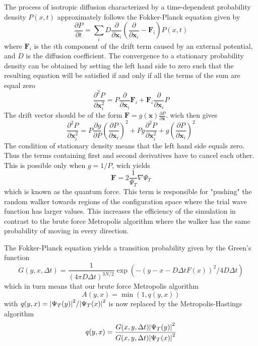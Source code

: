 \documentclass[a4paper, 10pt, english]{revtex4-2} %
\newcommand{\parder}[2]{\frac{\partial #1}{\partial #2}}
\newcommand{\dder}[2]{\frac{\partial^2 #1}{\partial #2^2}}
\begin{document}
        The process of isotropic diffusion characterized by a time-dependent probability density $P(x, t)$ approximately follows the Fokker-Planck equation given by
        \begin{equation}
            \parder{P}{t}
            =   \sum_i D\parder{}{\mathbf{x}_i}\left(\parder{}{\mathbf{x}_i} - \mathbf{F}_i\right)P(x, t)
        \end{equation}
        where $\mathbf{F}_i$ is the $i$th component of the drift term caused by an external potential, and $D$ is the diffusion coefficient. 
        The convergence to a stationary probability density can be obtained by setting the left hand side to zero such that the resulting equation will be satisfied if and only if all the terms of the sum are equal zero
        \begin{equation}
                \dder{P}{\mathbf{x}_i}
            =   P\parder{}{\mathbf{x}_i}\mathbf{F}_i + \mathbf{F}_i\parder{}{\mathbf{x}_i}P
        \end{equation}
        The drift vector should be of the form $\mathbf{F} = g(\mathbf{x})\parder{P}{\mathbf{x}}$. wich then gives
        \begin{equation}
            \dder{P}{\mathbf{x}_i}
            =   P\parder{g}{P}\left(\parder{P}{\mathbf{x}_i}\right)^2 + Pg\dder{P}{\mathbf{x}_i} + g\left(\parder{P}{\mathbf{x}_i}\right)^2
        \end{equation}
        The condition of stationary density means that the left hand side equals zero. 
        Thus the terms containing first and second derivatives have to cancel each other. 
        This is possible only when $g = 1/P$, wich yields
        \begin{equation}
                \mathbf{F}
            =   2\frac{1}{\Psi_T}\nabla\Psi_T
        \end{equation}
        which is known as the quantum force. 
        This term is responsible for "pushing" the random walker towards regions of the configuration space where the trial wave function has larger values. 
        This increases the efficiency of the simulation in contrast to the brute force Metropolis algorithm where the walker has the same probability of moving in every direction.

        The Fokker-Planck equation yields a transition probability given by the Green's function
        \begin{equation}
                G(y, x, \Delta t)
            =   \frac{1}{(4\pi D\Delta t)^{3N/2}} \exp(-(y - x - D\Delta t F(x))^2 / 4D\Delta t)
        \end{equation}
        which in turn means that our brute force Metropolis algorithm
        \begin{equation}
                A(y, x)
            =   \min(1, q(y, x))
        \end{equation}
        with $q(y, x) = \abs{\Psi_T(y)}^2/\abs{\Psi_T(x)}^2$ is now replaced by the Metropolis-Hastings algorithm
        \begin{equation}
                q(y, x)
            =   \frac{G(x, y, \Delta t)\abs{\Psi_T(y)}^2}{G(x, y, \Delta t)\abs{\Psi_T(x)}^2}
        \end{equation}
\end{document}
